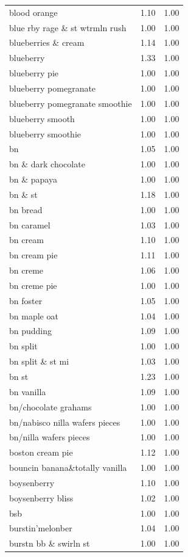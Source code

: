 \begin{table}
\begin{tabular}{lrr}
blood orange & 1.10 & 1.00 \\
blue rby rage \& st wtrmln rush & 1.00 & 1.00 \\
blueberries \& cream & 1.14 & 1.00 \\
blueberry & 1.33 & 1.00 \\
blueberry pie & 1.00 & 1.00 \\
blueberry pomegranate & 1.00 & 1.00 \\
blueberry pomegranate smoothie & 1.00 & 1.00 \\
blueberry smooth & 1.00 & 1.00 \\
blueberry smoothie & 1.00 & 1.00 \\
bn & 1.05 & 1.00 \\
bn \& dark chocolate & 1.00 & 1.00 \\
bn \& papaya & 1.00 & 1.00 \\
bn \& st & 1.18 & 1.00 \\
bn bread & 1.00 & 1.00 \\
bn caramel & 1.03 & 1.00 \\
bn cream & 1.10 & 1.00 \\
bn cream pie & 1.11 & 1.00 \\
bn creme & 1.06 & 1.00 \\
bn creme pie & 1.00 & 1.00 \\
bn foster & 1.05 & 1.00 \\
bn maple oat & 1.04 & 1.00 \\
bn pudding & 1.09 & 1.00 \\
bn split & 1.00 & 1.00 \\
bn split \& st mi & 1.03 & 1.00 \\
bn st & 1.23 & 1.00 \\
bn vanilla & 1.09 & 1.00 \\
bn/chocolate grahams & 1.00 & 1.00 \\
bn/nabisco nilla wafers pieces & 1.00 & 1.00 \\
bn/nilla wafers pieces & 1.00 & 1.00 \\
boston cream pie & 1.12 & 1.00 \\
bouncin banana\&totally vanilla & 1.00 & 1.00 \\
boysenberry & 1.10 & 1.00 \\
boysenberry bliss & 1.02 & 1.00 \\
bsb & 1.00 & 1.00 \\
burstin'melonber & 1.04 & 1.00 \\
burstn bb \& swirln st & 1.00 & 1.00 \\

\end{tabular}
\end{table}
